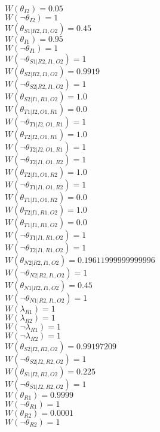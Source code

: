 $W(\theta_{I2})=0.05$\\
$W(\neg\theta_{I2})=1$\\
$W(\theta_{S1|R2,I1,O2})=0.45$\\
$W(\theta_{I1})=0.95$\\
$W(\neg\theta_{I1})=1$\\
$W(\neg\theta_{S1|R2,I1,O2})=1$\\
$W(\theta_{S2|R2,I1,O2})=0.9919$\\
$W(\neg\theta_{S2|R2,I1,O2})=1$\\
$W(\theta_{S2|I1,R1,O2})=1.0$\\
$W(\theta_{T1|I2,O1,R1})=0.0$\\
$W(\neg\theta_{T1|I2,O1,R1})=1$\\
$W(\theta_{T2|I2,O1,R1})=1.0$\\
$W(\neg\theta_{T2|I2,O1,R1})=1$\\
$W(\neg\theta_{T2|I1,O1,R2})=1$\\
$W(\theta_{T2|I1,O1,R2})=1.0$\\
$W(\neg\theta_{T1|I1,O1,R2})=1$\\
$W(\theta_{T1|I1,O1,R2})=0.0$\\
$W(\theta_{T2|I1,R1,O2})=1.0$\\
$W(\theta_{T1|I1,R1,O2})=0.0$\\
$W(\neg\theta_{T1|I1,R1,O2})=1$\\
$W(\neg\theta_{T2|I1,R1,O2})=1$\\
$W(\theta_{N2|R2,I1,O2})=0.19611999999999996$\\
$W(\neg\theta_{N2|R2,I1,O2})=1$\\
$W(\theta_{N1|R2,I1,O2})=0.45$\\
$W(\neg\theta_{N1|R2,I1,O2})=1$\\
$W(\lambda_{R1})=1$\\
$W(\lambda_{R2})=1$\\
$W(\neg\lambda_{R1})=1$\\
$W(\neg\lambda_{R2})=1$\\
$W(\theta_{S2|I2,R2,O2})=0.99197209$\\
$W(\neg\theta_{S2|I2,R2,O2})=1$\\
$W(\theta_{S1|I2,R2,O2})=0.225$\\
$W(\neg\theta_{S1|I2,R2,O2})=1$\\
$W(\theta_{R1})=0.9999$\\
$W(\neg\theta_{R1})=1$\\
$W(\theta_{R2})=0.0001$\\
$W(\neg\theta_{R2})=1$\\
